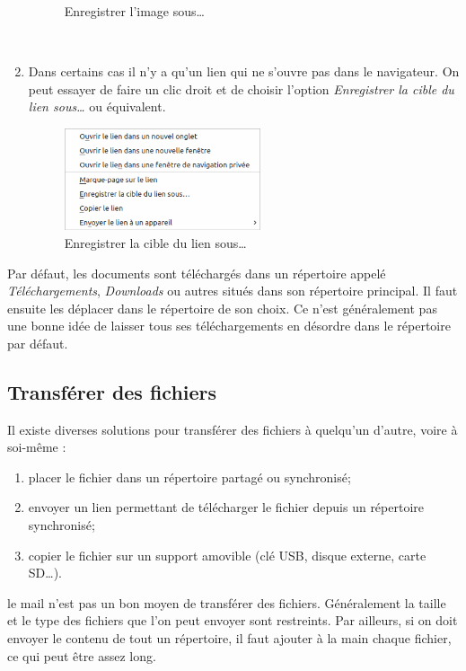 \documentclass[10pt,a4paper]{report}
\begin{document}
\begin{enumerate}
\begin{minipage}{.45\linewidth}
\begin{figure}[H]
				\caption{Enregistrer l'image sous\dots}
				\label{fig:capture_telechargement_03}
			\end{figure}
		\end{minipage} \\
	\item Dans certains cas il n'y a qu'un lien qui ne s'ouvre pas dans le navigateur. On peut essayer de faire un clic droit et de choisir l'option \emph{Enregistrer la cible du lien sous\dots} ou équivalent.
		\begin{figure}[H]
			\centering
			\includegraphics[height=3cm]{images/capture_telechargement_04}
			\caption{Enregistrer la cible du lien sous\dots}
			\label{fig:capture_telechargement_04}
		\end{figure}
\end{enumerate}

\attention Par défaut, les documents sont téléchargés dans un répertoire appelé \emph{Téléchargements}, \emph{Downloads} ou autres situés dans son répertoire principal. Il faut ensuite les déplacer dans le répertoire de son choix. Ce n'est généralement pas une bonne idée de laisser tous ses téléchargements en désordre dans le répertoire par défaut.



\subsection{Transférer des fichiers}

Il existe diverses solutions pour transférer des fichiers à quelqu'un d'autre, voire à soi-même :
\begin{enumerate}
	\item placer le fichier dans un répertoire partagé ou synchronisé;
	\item envoyer un lien permettant de télécharger le fichier depuis un répertoire synchronisé;
	\item copier le fichier sur un support amovible (clé USB, disque externe, carte SD\dots).
\end{enumerate}

\attention le mail n'est pas un bon moyen de transférer des fichiers. Généralement la taille et le type des fichiers que l'on peut envoyer sont restreints. Par ailleurs, si on doit envoyer le contenu de tout un répertoire, il faut ajouter à la main chaque fichier, ce qui peut être assez long.
\end{document}

